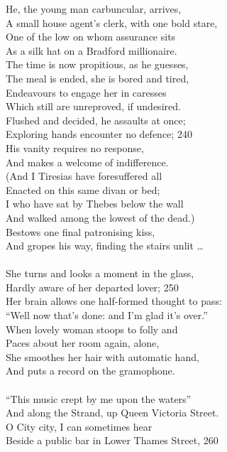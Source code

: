 \documentclass{article}
\begin{document}
He, the young man carbuncular, arrives, \\
A small house agent's clerk, with one bold stare, \\
One of the low on whom assurance sits \\
As a silk hat on a Bradford millionaire. \\
The time is now propitious, as he guesses, \\
The meal is ended, she is bored and tired, \\
Endeavours to engage her in caresses \\
Which still are unreproved, if undesired. \\
Flushed and decided, he assaults at once; \\
Exploring hands encounter no defence;                            \hfill 240 \\
His vanity requires no response, \\
And makes a welcome of indifference. \\
(And I Tiresias have foresuffered all \\
Enacted on this same divan or bed; \\
I who have sat by Thebes below the wall \\
And walked among the lowest of the dead.) \\
Bestows one final patronising kiss, \\
And gropes his way, finding the stairs unlit \ldots \\
 \\
She turns and looks a moment in the glass, \\
Hardly aware of her departed lover;                              \hfill 250 \\
Her brain allows one half-formed thought to pass: \\
``Well now that's done: and I'm glad it's over.'' \\
When lovely woman stoops to folly and \\
Paces about her room again, alone, \\
She smoothes her hair with automatic hand, \\
And puts a record on the gramophone. \\
 \\
``This music crept by me upon the waters'' \\
And along the Strand, up Queen Victoria Street. \\
O City city, I can sometimes hear \\
Beside a public bar in Lower Thames Street,                      \hfill 260 \\
\end{document}
